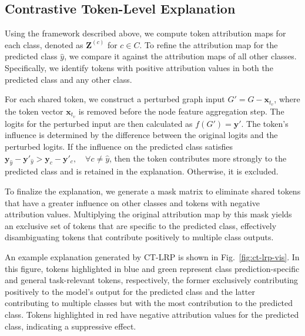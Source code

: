 
\subsection{Contrastive Token-Level Explanation}
Using the framework described above, we compute token attribution maps for each class, denoted as \( \mathbf{Z}^{(c)} \) for \( c \in C \). To refine the attribution map for the predicted class \( \hat{y} \), we compare it against the attribution maps of all other classes. Specifically, we identify tokens with positive attribution values in both the predicted class and any other class. 

For each shared token, we construct a perturbed graph input \( G' = G - \mathbf{x}_{t_v} \), where the token vector \( \mathbf{x}_{t_v} \) is removed before the node feature aggregation step. The logits for the perturbed input are then calculated as \( f(G') = \mathbf{y}' \). The token's influence is determined by the difference between the original logits and the perturbed logits. If the influence on the predicted class satisfies $\mathbf{y}_{\hat{y}} - \mathbf{y}'_{\hat{y}} > \mathbf{y}_c - \mathbf{y}'_c, \quad \forall c \neq \hat{y}$, then the token contributes more strongly to the predicted class and is retained in the explanation. Otherwise, it is excluded.

To finalize the explanation, we generate a mask matrix to eliminate shared tokens that have a greater influence on other classes and tokens with negative attribution values. Multiplying the original attribution map by this mask yields an exclusive set of tokens that are specific to the predicted class, effectively disambiguating tokens that contribute positively to multiple class outputs.

An example explanation generated by CT-LRP is shown in Fig.~\ref{fig:ct-lrp-vis}. In this figure, tokens highlighted in blue and green represent class prediction-specific and general task-relevant tokens, respectively, the former exclusively contributing positively to the model's output for the predicted class and the latter contributing to multiple classes but with the most contribution to the predicted class. Tokens highlighted in red have negative attribution values for the predicted class, indicating a suppressive effect.

